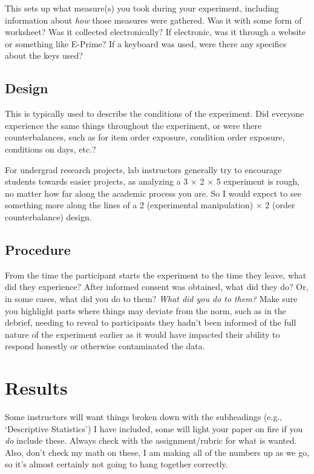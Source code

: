 \documentclass[stu,12pt,floatsintext]{apa7}
\begin{document}
This sets up what measure(s) you took during your experiment, including information about \textit{how} those measures were gathered. Was it with some form of worksheet? Was it collected electronically? If electronic, was it through a website or something like E-Prime? If a keyboard was used, were there any specifics about the keys used?

\subsection{Design}

This is typically used to describe the conditions of the experiment. Did everyone experience the same things throughout the experiment, or were there counterbalances, such as for item order exposure, condition order exposure, conditions on days, etc.?

For undergrad research projects, lab instructors generally try to encourage students towards easier projects, as analyzing a 3 \(\times\) 2 \(\times\) 5 experiment is rough, no matter how far along the academic process you are. So I would expect to see something more along the lines of a 2 (experimental manipulation) \(\times\) 2 (order counterbalance) design.


\subsection{Procedure}

From the time the participant starts the experiment to the time they leave, what did they experience? After informed consent was obtained, what did they do? Or, in some cases, what did you do to them? \textit{What did you do to them?} Make sure you highlight parts where things may deviate from the norm, such as in the debrief, needing to reveal to participants they hadn't been informed of the full nature of the experiment earlier as it would have impacted their ability to respond honestly or otherwise contaminated the data.



\renewcommand{\theenumi}{\arabic{enumi}}
\renewcommand{\labelenumi}{\theenumi.}
\section{Results}

Some instructors will want things broken down with the subheadings (e.g., `Descriptive Statistics') I have included, some will light your paper on fire if you \textit{do} include these. Always check with the assignment/rubric for what is wanted. Also, don't check my math on these, I am making all of the numbers up as we go, so it's almost certainly not going to hang together correctly.
\end{document}
